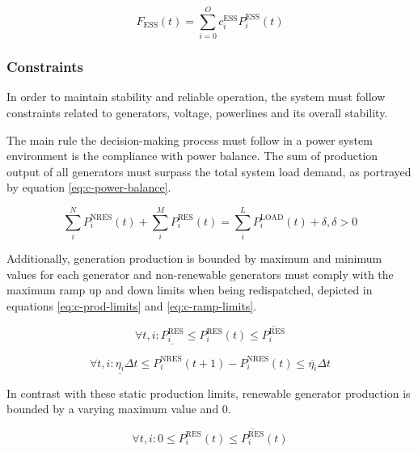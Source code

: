 \begin{equation} \label{eq:ess-cost}
	F_\text{ESS}(t) = \sum^O_{i=0} c^\text{ESS}_i P^\text{ESS}_i(t) 
\end{equation}


\subsubsection{Constraints}

In order to maintain stability and reliable operation, the system must follow constraints related to generators, voltage, powerlines and its overall stability.  \par

The main rule the decision-making process must follow in a power system environment is the compliance with power balance. The sum of production output of all generators must surpass the total system load demand, as portrayed by equation \ref{eq:c-power-balance}. 

\begin{equation} \label{eq:c-power-balance}
	\sum^N_i P^\text{NRES}_i(t) + \sum^M_i P^\text{RES}_i(t) = \sum^L_i P^\text{LOAD}_i(t) + \delta, \delta > 0
\end{equation}

Additionally, generation production is bounded by maximum and minimum values for each generator and non-renewable generators must comply with the maximum ramp up and down limits when being redispatched, depicted in equations \ref{eq:c-prod-limits} and \ref{eq:c-ramp-limits}. \par

\begin{equation} \label{eq:c-prod-limits}
	\forall t, i: \underline{P^\text{RES}_i} \leq P^\text{RES}_i(t) \leq \overline{P^\text{RES}_i}
\end{equation}

\begin{equation} \label{eq:c-ramp-limits}
	\forall t, i: \underline{\eta_i } \Delta t \leq P^\text{NRES}_i (t + 1) - P^\text{NRES}_i (t) \leq \overline{\eta_i} \Delta t
\end{equation}

In contrast with these static production limits, renewable generator production is bounded by a varying maximum value and 0.

\begin{equation}
	\forall t, i: 0 \leq P^\text{RES}_i (t) \leq \overline{P^\text{RES}_i} (t)
\end{equation}

